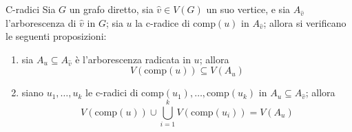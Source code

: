\documentclass[a4paper, 12pt]{report}
\begin{document}
    \begin{framedthm}{C-radici}
        \label{cradiciteorema}
        Sia $G$ un grafo diretto, sia $\hat v \in V(G)$ un suo vertice, e sia $A_{\hat v}$ l'arborescenza di $\hat v$ in $G$; sia $u$ la c-radice di $\mathrm{comp}(u)$ in $A_{\hat v}$; allora si verificano le seguenti proposizioni:

        \begin{enumerate}[label=\roman*), font=\itshape]
            \item sia $A_u \subseteq A_{\hat v}$ è l'arborescenza radicata in $u$; allora $$V(\mathrm{comp}(u)) \subseteq V(A_u)$$
            \item siano $u_1, \ldots, u_k$ le c-radici di $\mathrm{comp}(u_1), \ldots, \mathrm{comp}(u_k)$ in $A_u \subseteq A_{\hat v}$; allora $$V(\mathrm{comp}(u)) \cup \displaystyle \bigcup_{i = 1}^k {V(\mathrm{comp}(u_i))} = V(A_u)$$
        \end{enumerate}
    \end{framedthm}
\end{document}
